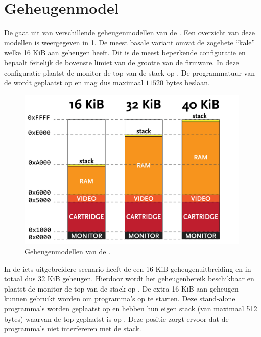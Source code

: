 %
%
%
\section{Geheugenmodel}
\label{sec:memory-model}

De \product gaat uit van verschillende geheugenmodellen van de . Een overzicht van deze modellen is weergegeven in \cref{fig:memory-models}. De meest basale variant omvat de zogehete ``kale''  welke 16 KiB aan geheugen heeft. Dit is de meest beperkende configuratie en bepaalt feitelijk de bovenste limiet van de grootte van de firmware. In deze configuratie plaatst de monitor de top van de stack op . De programmatuur van de \product wordt geplaatst op  en mag dus maximaal $11520$ bytes beslaan.

\begin{figure}[h!]
    \centering
    \includegraphics[width=0.99\textwidth]{img/memory_models.png}
    \caption{Geheugenmodellen van de .}
    \label{fig:memory-models}
\end{figure}

In de iets uitgebreidere scenario heeft de  een 16 KiB geheugenuitbreiding en in totaal dus 32 KiB geheugen. Hierdoor wordt het geheugenbereik  beschikbaar en plaatst de monitor de top van de stack op . De extra 16 KiB aan geheugen kunnen gebruikt worden om  programma's op te starten. Deze stand-alone programma's worden geplaatst op  en hebben hun eigen stack (van maximaal 512 bytes) waarvan de top geplaatst is op . Deze positie zorgt ervoor dat de programma's niet interfereren met de  stack.

